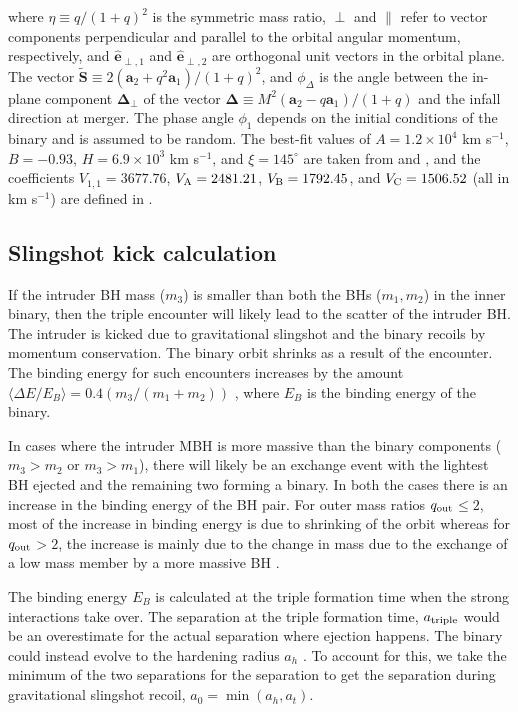 \documentclass[twocolumn,linenumbers]{aastex701}
\newcommand{\kms}{km s$^{-1}$}
\newcommand{\qout}{$q_{\rm out}$}
\begin{document}
where $\eta \equiv q/(1+q)^2$ is the symmetric mass ratio, $\perp$ and $\parallel$ refer to vector components perpendicular and parallel to the orbital angular momentum, respectively, and ${\mathbf {\hat e}_{\perp,1}}$ and ${\mathbf {\hat e}_{\perp,2}}$ are orthogonal unit vectors in the orbital plane. The vector ${\mathbf {\tilde S}} \equiv 2({\mathbf a_2} + q^2 {\mathbf a_1})/(1+q)^2$, and $\phi_{\Delta}$ is the angle between the in-plane component ${\mathbf \Delta_{\perp}}$ of the vector ${\mathbf \Delta} \equiv M^2({\mathbf a_2} - q {\mathbf a_1})/(1+q)$ and the infall direction at merger. The phase angle $\phi_1$ depends on the initial conditions of the binary and is assumed to be random. The best-fit values of $A = 1.2\times 10^4$ \kms, $B = -0.93$, $H = 6.9\times10^3$ \kms, and $\xi = 145^{\circ}$ are taken from \cite{Gonz_lez_2007} and \cite{Lousto2008}, and the coefficients $V_{1,1} = 3677.76$, $V_{\rm A} = 2481.21$, $V_{\rm B} = 1792.45$, and $V_{\rm C} = 1506.52$ (all in km s$^{-1}$) are defined in \cite{Lousto_2012}.


\subsection{Slingshot kick calculation}
\label{sec: triple kick calculation}

If the intruder BH mass ($m_3$) is smaller than both the BHs ($m_1,m_2$) in the inner binary, then the triple encounter will likely lead to the scatter of the intruder BH. The intruder is kicked due to gravitational slingshot and the binary recoils by momentum conservation. The binary orbit shrinks as a result of the encounter. The binding energy for such encounters increases by the amount $\langle\Delta E/ E_B\rangle = 0.4 (m_3/(m_1 + m_2))$ \citep{Hills1980}, where $E_B$ is the binding energy of the binary. 

In cases where the intruder MBH is more massive than the binary components ($m_3 > m_2$ or $m_3 > m_1$), there will likely be an exchange event with the lightest BH ejected and the remaining two forming a binary. In both the cases there is an increase in the binding energy of the BH pair. For outer mass ratios \qout $\leq 2$, most of the increase in binding energy is due to shrinking of the orbit whereas for \qout $> 2$, the increase is mainly due to the change in mass due to the exchange of a low mass member by a more massive BH \citep{volonteri_assembly_2003}. 

The binding energy $E_B$ is calculated at the triple formation time when the strong interactions take over. The separation at the triple formation time, $a_{\rm triple}$ would be an overestimate for the actual separation where ejection happens. The binary could instead evolve to the hardening radius $a_h$ \citep{quinlan_dynamical_1996,Begelman1980}. To account for this, we take the minimum of the two separations for the separation to get the separation during gravitational slingshot recoil, $a_{0} = \min(a_h, a_{t})$.
\end{document}
